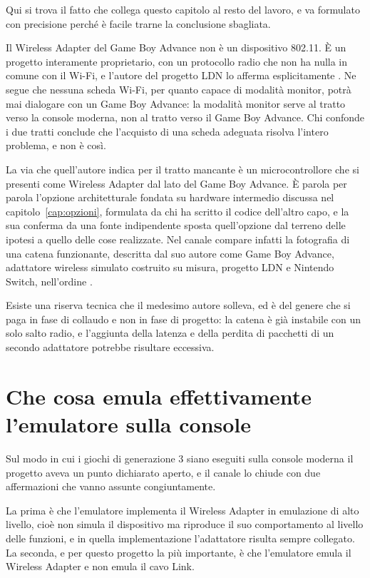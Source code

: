 Qui si trova il fatto che collega questo capitolo al resto del lavoro, e va formulato con precisione perché è facile trarne la conclusione sbagliata.

Il Wireless Adapter del Game Boy Advance non è un dispositivo 802.11. È un progetto interamente proprietario, con un protocollo radio che non ha nulla in comune con il Wi-Fi, e l'autore del progetto LDN lo afferma esplicitamente \cite{kinnay-ldn}. Ne segue che nessuna scheda Wi-Fi, per quanto capace di modalità monitor, potrà mai dialogare con un Game Boy Advance: la modalità monitor serve al tratto verso la console moderna, non al tratto verso il Game Boy Advance. Chi confonde i due tratti conclude che l'acquisto di una scheda adeguata risolva l'intero problema, e non è così.

La via che quell'autore indica per il tratto mancante è un microcontrollore che si presenti come Wireless Adapter dal lato del Game Boy Advance. È parola per parola l'opzione architetturale fondata su hardware intermedio discussa nel capitolo~\ref{cap:opzioni}, formulata da chi ha scritto il codice dell'altro capo, e la sua conferma da una fonte indipendente sposta quell'opzione dal terreno delle ipotesi a quello delle cose realizzate. Nel canale compare infatti la fotografia di una catena funzionante, descritta dal suo autore come Game Boy Advance, adattatore wireless simulato costruito su misura, progetto LDN e Nintendo Switch, nell'ordine \cite{pmr-discord}.

Esiste una riserva tecnica che il medesimo autore solleva, ed è del genere che si paga in fase di collaudo e non in fase di progetto: la catena è già instabile con un solo salto radio, e l'aggiunta della latenza e della perdita di pacchetti di un secondo adattatore potrebbe risultare eccessiva.

\section{Che cosa emula effettivamente l'emulatore sulla console}

Sul modo in cui i giochi di generazione 3 siano eseguiti sulla console moderna il progetto aveva un punto dichiarato aperto, e il canale lo chiude con due affermazioni che vanno assunte congiuntamente.

La prima è che l'emulatore implementa il Wireless Adapter in emulazione di alto livello, cioè non simula il dispositivo ma riproduce il suo comportamento al livello delle funzioni, e in quella implementazione l'adattatore risulta sempre collegato. La seconda, e per questo progetto la più importante, è che l'emulatore emula il Wireless Adapter e non emula il cavo Link.

